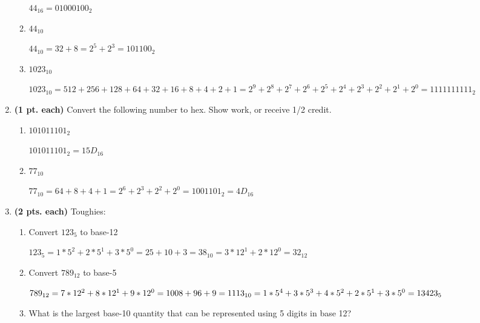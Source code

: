 \begin{enumerate}
\begin{enumerate}
	\begin{solution}{ $44_{16} =0100 0100_2$}\end{solution}
	\item $44_{10}$

	\begin{solution}{ $44_{10} = 32+8 = 2^5+2^3=101100_2$}\end{solution}
	\item $1023_{10}$

	\begin{solution}{ $1023_{10} = 512+256+128+64+32+16+8+4+2+1=
        2^9+2^8+2^7+2^6+2^5+2^4+2^3+2^2+2^1+2^0=1111111111_2$}\end{solution}
	\end{enumerate}


\item {\bf (1 pt. each)} Convert the following number to hex. Show 
work, or receive 1/2 credit.
	\begin{enumerate}
	\item $101011101_2$

	\begin{solution}{ $1 0101 1101_2 = 15D_{16}$ }\end{solution}
	\item $77_{10}$

	\begin{solution}{ $77_{10} = 64+8+4+1=2^6+2^3+2^2+2^0=100 1101_2=4D_{16}$ }\end{solution}
	\end{enumerate}


\item {\bf (2 pts. each)} Toughies:
	\begin{enumerate}
	\item Convert $123_5$ to base-12

	\begin{solution}{       $123_5 = 1*5^2 + 2*5^1 + 3*5^0 = 25+10+3=38_{10}=
        3*12^1 + 2*12^0 = 32_{12}$ }\end{solution}
	\item Convert $789_{12}$ to base-5

	\begin{solution}{	$789_{12} = 7*12^2+8*12^1+9*12^0=1008+96+9=1113_{10}= \\
        1*5^4+3*5^3 + 4*5^2 + 2*5^1 + 3*5^0 = 13423_5$ }\end{solution}
	\item What is the largest base-10 quantity that can be represented
	using 5 digits in base 12?


\end{enumerate}
\end{enumerate}
